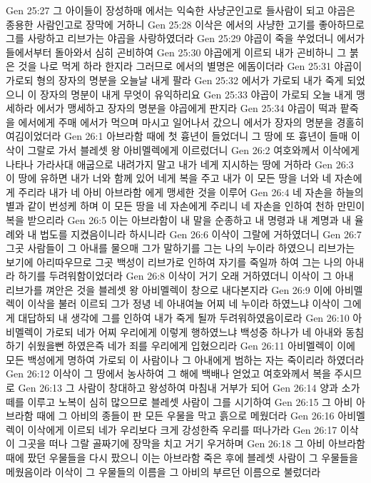 Gen 25:27  그 아이들이 장성하매 에서는 익숙한 사냥군인고로 들사람이 되고 야곱은 종용한 사람인고로 장막에 거하니
Gen 25:28  이삭은 에서의 사냥한 고기를 좋아하므로 그를 사랑하고 리브가는 야곱을 사랑하였더라
Gen 25:29  야곱이 죽을 쑤었더니 에서가 들에서부터 돌아와서 심히 곤비하여
Gen 25:30  야곱에게 이르되 내가 곤비하니 그 붉은 것을 나로 먹게 하라 한지라 그러므로 에서의 별명은 에돔이더라
Gen 25:31  야곱이 가로되 형의 장자의 명분을 오늘날 내게 팔라
Gen 25:32  에서가 가로되 내가 죽게 되었으니 이 장자의 명분이 내게 무엇이 유익하리요
Gen 25:33  야곱이 가로되 오늘 내게 맹세하라 에서가 맹세하고 장자의 명분을 야곱에게 판지라
Gen 25:34  야곱이 떡과 팥죽을 에서에게 주매 에서가 먹으며 마시고 일어나서 갔으니 에서가 장자의 명분을 경홀히 여김이었더라
Gen 26:1  아브라함 때에 첫 흉년이 들었더니 그 땅에 또 흉년이 들매 이삭이 그랄로 가서 블레셋 왕 아비멜렉에게 이르렀더니
Gen 26:2  여호와께서 이삭에게 나타나 가라사대 애굽으로 내려가지 말고 내가 네게 지시하는 땅에 거하라
Gen 26:3  이 땅에 유하면 내가 너와 함께 있어 네게 복을 주고 내가 이 모든 땅을 너와 네 자손에게 주리라 내가 네 아비 아브라함 에게 맹세한 것을 이루어
Gen 26:4  네 자손을 하늘의 별과 같이 번성케 하며 이 모든 땅을 네 자손에게 주리니 네 자손을 인하여 천하 만민이 복을 받으리라
Gen 26:5  이는 아브라함이 내 말을 순종하고 내 명령과 내 계명과 내 율례와 내 법도를 지켰음이니라 하시니라
Gen 26:6  이삭이 그랄에 거하였더니
Gen 26:7  그곳 사람들이 그 아내를 물으매 그가 말하기를 그는 나의 누이라 하였으니 리브가는 보기에 아리따우므로 그곳 백성이 리브가로 인하여 자기를 죽일까 하여 그는 나의 아내라 하기를 두려워함이었더라
Gen 26:8  이삭이 거기 오래 거하였더니 이삭이 그 아내 리브가를 껴안은 것을 블레셋 왕 아비멜렉이 창으로 내다본지라
Gen 26:9  이에 아비멜렉이 이삭을 불러 이르되 그가 정녕 네 아내여늘 어찌 네 누이라 하였느냐 이삭이 그에게 대답하되 내 생각에 그를 인하여 내가 죽게 될까 두려워하였음이로라
Gen 26:10  아비멜렉이 가로되 네가 어찌 우리에게 이렇게 행하였느냐 백성중 하나가 네 아내와 동침하기 쉬웠을뻔 하였은즉 네가 죄를 우리에게 입혔으리라
Gen 26:11  아비멜렉이 이에 모든 백성에게 명하여 가로되 이 사람이나 그 아내에게 범하는 자는 죽이리라 하였더라
Gen 26:12  이삭이 그 땅에서 농사하여 그 해에 백배나 얻었고 여호와께서 복을 주시므로
Gen 26:13  그 사람이 창대하고 왕성하여 마침내 거부가 되어
Gen 26:14  양과 소가 떼를 이루고 노복이 심히 많으므로 블레셋 사람이 그를 시기하여
Gen 26:15  그 아비 아브라함 때에 그 아비의 종들이 판 모든 우물을 막고 흙으로 메웠더라
Gen 26:16  아비멜렉이 이삭에게 이르되 네가 우리보다 크게 강성한즉 우리를 떠나가라
Gen 26:17  이삭이 그곳을 떠나 그랄 골짜기에 장막을 치고 거기 우거하며
Gen 26:18  그 아비 아브라함 때에 팠던 우물들을 다시 팠으니 이는 아브라함 죽은 후에 블레셋 사람이 그 우물들을 메웠음이라 이삭이 그 우물들의 이름을 그 아비의 부르던 이름으로 불렀더라
